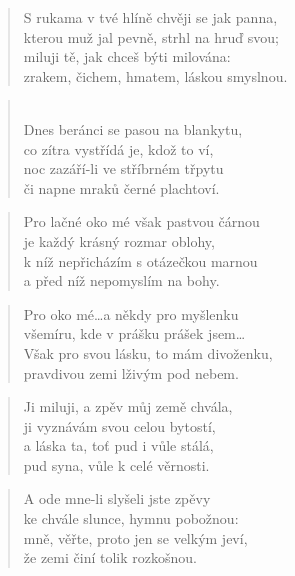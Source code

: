 \documentclass{book}
\begin{document}
\begin{verse}
S rukama v tvé hlíně chvěji se jak panna,\\
kterou muž jal pevně, strhl na hruď svou;\\
miluji tě, jak chceš býti milována:\\
zrakem, čichem, hmatem, láskou smyslnou.
\end{verse}
\begin{verse}
\large{}\\
\normalsize
Dnes beránci se pasou na blankytu,\\
co zítra vystřídá je, kdož to ví,\\
noc zazáří-li ve stříbrném třpytu\\
či napne mraků černé plachtoví.
\end{verse}
\begin{verse}
Pro lačné oko mé však pastvou čárnou\\
je každý krásný rozmar oblohy,\\
k níž nepřicházím s otázečkou marnou\\
a před níž nepomyslím na bohy.
\end{verse}
\begin{verse}
Pro oko mé\ldots a někdy pro myšlenku\\
všemíru, kde v prášku prášek jsem\ldots\\
Však pro svou lásku, to mám divoženku,\\
pravdivou zemi lživým pod nebem.
\end{verse}
\begin{verse}
Ji miluji, a zpěv můj země chvála,\\
ji vyznávám svou celou bytostí,\\
a láska ta, toť pud i vůle stálá,\\
pud syna, vůle k celé věrnosti.
\end{verse}
\begin{verse}
A ode mne-li slyšeli jste zpěvy\\
ke chvále slunce, hymnu pobožnou:\\
mně, věřte, proto jen se velkým jeví,\\
že zemi činí tolik rozkošnou.
\end{verse}
\end{document}
